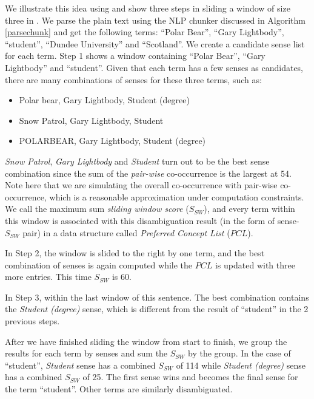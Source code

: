 We illustrate this idea using  and show three steps
in sliding a window of size three in .
We parse the plain text using the NLP chunker discussed in Algorithm \ref{parsechunk}
and get the following terms: ``Polar Bear'', ``Gary Lightbody'', ``student'',
``Dundee University'' and ``Scotland''.
We create a candidate sense list for each term. Step 1 shows a window
containing ``Polar Bear'', ``Gary Lightbody'' and ``student''. Given that
each term has a few senses as candidates,
there are many combinations of senses for these three terms, such as:
\begin{itemize}
\item Polar bear, Gary Lightbody, Student (degree)
\shrink\item Snow Patrol, Gary Lightbody, Student
\shrink\item POLARBEAR, Gary Lightbody, Student (degree)
\end{itemize}
{\em Snow Patrol}, {\em Gary Lightbody} and {\em Student} turn out to be
the best sense combination since the sum of the {\em pair-wise}
co-occurrence is the largest at 54. Note here that we are simulating
the overall co-occurrence with pair-wise co-occurrence, which is a reasonable
approximation under computation constraints. We call the maximum sum
{\em sliding window score} ($S_{SW}$), and every term within this window
is associated with this disambiguation result (in the form of sense-$S_{SW}$ pair)
in a data structure called {\em Preferred Concept List} ($PCL$).

In Step 2, the window is slided to the right by one term, and the best
combination of senses is again computed while the $PCL$ is updated with three
more entries. This time $S_{SW}$ is 60.

In Step 3, within the last window of this sentence. The best combination
contains the {\em Student (degree)} sense, which is different from the result
of ``student'' in the 2 previous steps.

After we have finished sliding the window from start to finish, we group
the results for each term by senses and sum the $S_{SW}$ by the group.
In the case of ``student'', {\em Student} sense has a combined $S_{SW}$ of
114 while {\em Student (degree)} sense has a combined $S_{SW}$ of 25. The
first sense wins and becomes the final sense for the term ``student''.
Other terms are similarly disambiguated.

